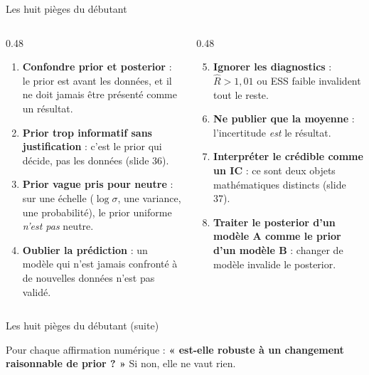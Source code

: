\begin{frame}{Les huit pièges du débutant}
\begin{columns}[t]
\begin{column}{0.48\textwidth}
\begin{wbox}
\begin{enumerate}
  \item \textbf{Confondre prior et posterior} : le prior est avant les données,
        et il ne doit jamais être présenté comme un résultat.
  \item \textbf{Prior trop informatif sans justification} : c'est le prior qui
        décide, pas les données (slide 36).
  \item \textbf{Prior vague pris pour neutre} : sur une échelle
        ($\log\sigma$, une variance, une probabilité), le prior uniforme
        \emph{n'est pas} neutre.
  \item \textbf{Oublier la prédiction} : un modèle qui n'est jamais confronté
        à de nouvelles données n'est pas validé.
\end{enumerate}
\end{wbox}
\end{column}
\begin{column}{0.48\textwidth}
\begin{wbox}
\begin{enumerate}
  \setcounter{enumi}{4}
  \item \textbf{Ignorer les diagnostics} : $\hat R > 1{,}01$ ou ESS faible
        invalident tout le reste.
  \item \textbf{Ne publier que la moyenne} : l'incertitude \emph{est} le résultat.
  \item \textbf{Interpréter le crédible comme un IC} : ce sont deux objets
        mathématiques distincts (slide 37).
  \item \textbf{Traiter le posterior d'un modèle A comme le prior d'un modèle B} :
        changer de modèle invalide le posterior.
\end{enumerate}
\end{wbox}
\end{column}
\end{columns}
\vspace{1mm}
\end{frame}

\begin{frame}{Les huit pièges du débutant (suite)}
\begin{kbox}
Pour chaque affirmation numérique : \textbf{« est-elle robuste à un changement
raisonnable de prior ? »} Si non, elle ne vaut rien.
\end{kbox}
\end{frame}

